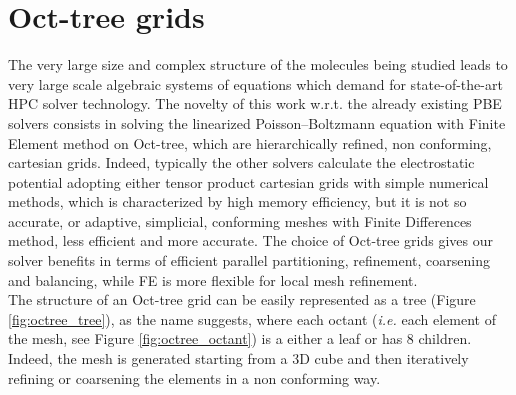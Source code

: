 \documentclass[11pt,a4paper]{article}
\begin{document}
\section{Oct-tree grids}
\label{sec:octree}
The very large size and complex structure of the molecules being studied leads to very large scale algebraic systems of equations which demand for state-of-the-art HPC solver technology. The novelty of this work w.r.t. the already existing PBE solvers consists in solving the linearized Poisson--Boltzmann equation with Finite Element method on Oct-tree, which are hierarchically refined, non conforming, cartesian grids. Indeed, typically the other solvers calculate the electrostatic potential adopting either tensor product cartesian grids with simple numerical methods, which is characterized by high memory efficiency, but it is not so accurate, or adaptive, simplicial, conforming meshes with Finite Differences method, less efficient and more accurate. The choice of Oct-tree grids gives our solver benefits in terms of efficient parallel partitioning, refinement, coarsening and balancing, while FE is more flexible for local mesh refinement. \\
The structure of an Oct-tree grid can be easily represented as a tree (Figure \ref{fig:octree_tree}), as the name suggests, where each octant ({\it i.e.} each element of the mesh, see Figure \ref{fig:octree_octant}) is a either a leaf or has 8 children. Indeed, the mesh is generated starting from a 3D cube and then iteratively refining or coarsening the elements in a non conforming way. 
\end{document}
